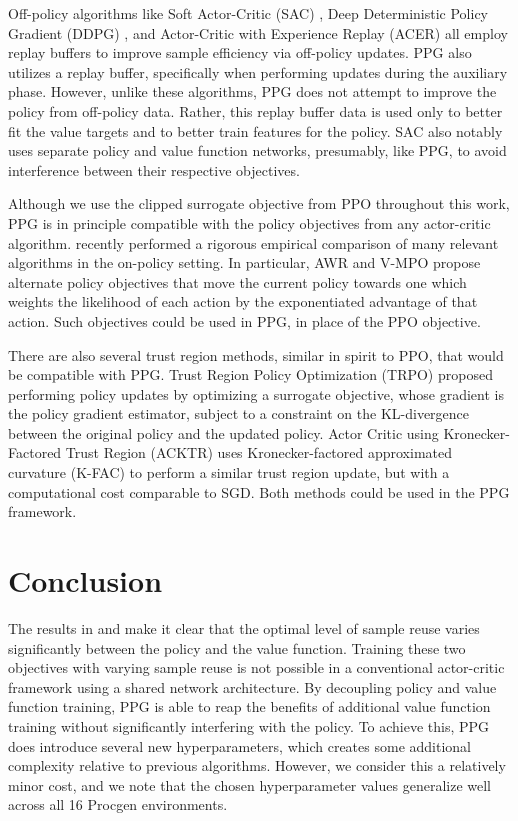 \documentclass{article}
\begin{document}
Off-policy algorithms like Soft Actor-Critic (SAC) \citep{sac}, Deep Deterministic Policy Gradient (DDPG) \citep{ddpg}, and Actor-Critic with Experience Replay (ACER) \citep{acer} all employ replay buffers to improve sample efficiency via off-policy updates. PPG also utilizes a replay buffer, specifically when performing updates during the auxiliary phase. However, unlike these algorithms, PPG does not attempt to improve the policy from off-policy data. Rather, this replay buffer data is used only to better fit the value targets and to better train features for the policy. SAC also notably uses separate policy and value function networks, presumably, like PPG, to avoid interference between their respective objectives.

Although we use the clipped surrogate objective from PPO \citep{ppo} throughout this work, PPG is in principle compatible with the policy objectives from any actor-critic algorithm. \cite{andrychowicz2020matters} recently performed a rigorous empirical comparison of many relevant algorithms in the on-policy setting. In particular, AWR \citep{awr} and V-MPO \citep{vmpo} propose alternate policy objectives that move the current policy towards one which weights the likelihood of each action by the exponentiated advantage of that action. Such objectives could be used in PPG, in place of the PPO objective.

There are also several trust region methods, similar in spirit to PPO, that would be compatible with PPG. Trust Region Policy Optimization (TRPO) \citep{trpo} proposed performing policy updates by optimizing a surrogate objective, whose gradient is the policy gradient estimator, subject to a constraint on the KL-divergence between the original policy and the updated policy. Actor Critic using Kronecker-Factored Trust Region (ACKTR) \citep{acktr} uses Kronecker-factored approximated curvature (K-FAC) to perform a similar trust region update, but with a computational cost comparable to SGD. Both methods could be used in the PPG framework.

\section{Conclusion}

The results in  and  make it clear that the optimal level of sample reuse varies significantly between the policy and the value function. Training these two objectives with varying sample reuse is not possible in a conventional actor-critic framework using a shared network architecture. By decoupling policy and value function training, PPG is able to reap the benefits of additional value function training without significantly interfering with the policy. To achieve this, PPG does introduce several new hyperparameters, which creates some additional complexity relative to previous algorithms. However, we consider this a relatively minor cost, and we note that the chosen hyperparameter values generalize well across all 16 Procgen environments.
\end{document}
